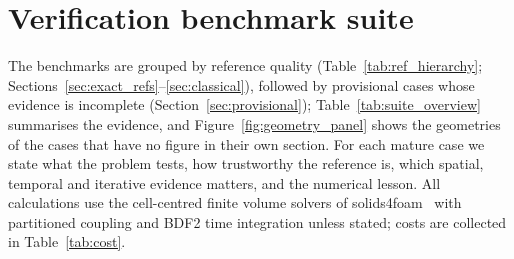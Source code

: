 \section{Verification benchmark suite}\label{sec:benchmark_suite}

The benchmarks are grouped by reference quality (Table~\ref{tab:ref_hierarchy}; Sections~\ref{sec:exact_refs}--\ref{sec:classical}), followed by provisional cases whose evidence is incomplete (Section~\ref{sec:provisional}); Table~\ref{tab:suite_overview} summarises the evidence, and Figure~\ref{fig:geometry_panel} shows the geometries of the cases that have no figure in their own section.
For each mature case we state what the problem tests, how trustworthy the reference is, which spatial, temporal and iterative evidence matters, and the numerical lesson.
All calculations use the cell-centred finite volume solvers of solids4foam~\citep{Cardiff2025} with partitioned coupling and BDF2 time integration unless stated; costs are collected in Table~\ref{tab:cost}.

